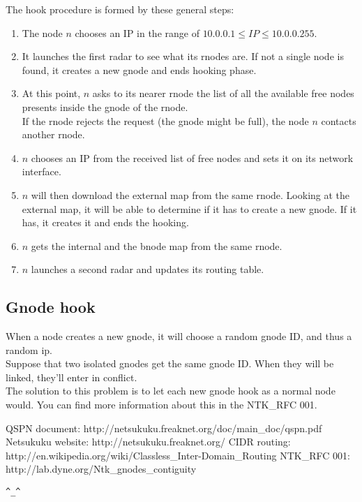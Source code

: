 \documentclass[a4paper]{article}
\newcommand{\href}[2]{ #1 }
\begin{document}
The hook procedure is formed by these general steps:
\begin{enumerate}
	\item The node $n$ chooses an IP in the range of $10.0.0.1 \le IP \le
		10.0.0.255$.
	\item It launches the first radar to see what its rnodes are. If not a
		single node is found, it creates a new gnode and ends hooking
		phase.
	\item At this point, $n$ asks to its nearer rnode the list of all the
		available free nodes presents inside the gnode of the rnode.\\
		If the rnode rejects the request (the gnode might be full),
		the node $n$ contacts another rnode.
	\item $n$ chooses an IP from the received list of free nodes and sets
		it on its network interface.
	\item $n$ will then download the external map from the same rnode.
		Looking at the external map, it will be able to determine if
		it has to create a new gnode. If it has, it creates it and
		ends the hooking.
	\item $n$ gets the internal and the bnode map from the same rnode.
	\item $n$ launches a second radar and updates its routing table.
\end{enumerate}


\subsection{Gnode hook}
When a node creates a new gnode, it will choose a random gnode ID, and thus
a random ip.\\
Suppose that two isolated gnodes get the same gnode ID. When they will be
linked, they'll enter in conflict.\\
The solution to this problem is to let each new gnode hook as a normal node
would. You can find more information about this in the NTK\_RFC 001\cite{gnodecontiguity}.


%


\begin{thebibliography}{99}
	 QSPN document:
		\href{http://netsukuku.freaknet.org/doc/main\_doc/qspn.pdf}{qspn.pdf}
	 Netsukuku website:
		\href{http://netsukuku.freaknet.org/}{http://netsukuku.freaknet.org/}
	 CIDR routing:
		\href{http://en.wikipedia.org/wiki/Classless\_Inter-Domain\_Routing}{Classless\_Inter-Domain\_Routing in Wikipedia}
	 NTK\_RFC 001:
		\href{http://lab.dyne.org/Ntk\_gnodes\_contiguity}{Gnode contiguity}
\end{thebibliography}
\newpage

\begin{center}
\verb|^_^|
\end{center}
\end{document}
